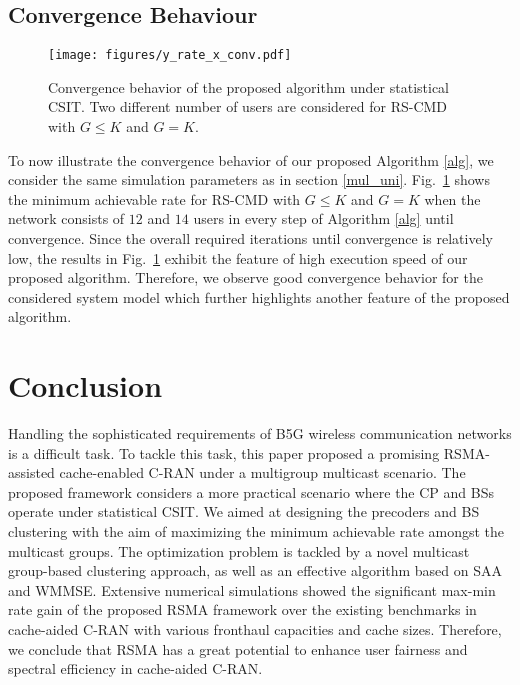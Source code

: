 \documentclass[12pt,draftcls,onecolumn]{IEEEtran}
\theoremstyle{remark}
\theoremstyle{definition}
\begin{document}
{\subsection{Convergence Behaviour}
\begin{figure}
	\centering
	\texttt{[image: figures/y\_rate\_x\_conv.pdf]}
	\caption{Convergence behavior of the proposed algorithm under statistical CSIT. Two different number of users are considered for RS-CMD with $G\leq K$ and $G=K$.} %
	\label{y_rate_x_conv_im}
\end{figure}
To now illustrate the convergence behavior of our proposed Algorithm \ref{alg}, we consider the same simulation parameters as in section \ref{mul_uni}. Fig.~\ref{y_rate_x_conv_im} shows the minimum achievable rate for RS-CMD with $G\leq K$ and $G=K$ when the network consists of $12$ and $14$ users in every step of Algorithm \ref{alg} until convergence. Since the overall required iterations until convergence is relatively low, the results in Fig.~\ref{y_rate_x_conv_im} exhibit the feature of high execution speed of our proposed algorithm. Therefore, we observe good convergence behavior for the considered system model which further highlights another feature of the proposed algorithm.

\section{Conclusion} \label{sec:C}
Handling the sophisticated requirements of B5G wireless communication networks is a difficult task. To tackle this task, this paper proposed a promising RSMA-assisted cache-enabled C-RAN under a multigroup multicast scenario. The proposed framework considers a more practical scenario where the CP and BSs operate under statistical CSIT. We aimed at designing the precoders and BS clustering with the aim of maximizing the minimum achievable rate amongst the multicast groups. The optimization problem is tackled by a novel multicast group-based clustering approach, as well as an effective algorithm based on SAA and WMMSE. Extensive numerical simulations showed the significant max-min rate gain of the proposed RSMA framework over the existing benchmarks in cache-aided C-RAN with various fronthaul capacities and cache sizes. Therefore, we conclude that RSMA has a great potential to enhance user fairness and spectral efficiency in cache-aided C-RAN.
\appendices
}
\end{document}
